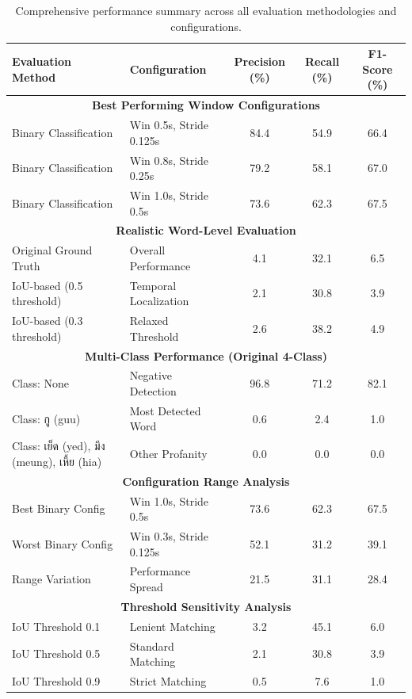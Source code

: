 \documentclass[11pt]{article}
\newcommand{\textthai}[1]{{\thaifont #1}}
\begin{document}
\begin{table}[H]
    \caption{Comprehensive performance summary across all evaluation methodologies and configurations.}
    \centering
    \label{tab:comprehensive-summary}
    \begin{tabular}{|l|l|c|c|c|}
        \hline
        \textbf{Evaluation Method} & \textbf{Configuration} & \textbf{Precision (\%)} & \textbf{Recall (\%)} & \textbf{F1-Score (\%)} \\
        \hline
        \multicolumn{5}{|c|}{\textbf{Best Performing Window Configurations}} \\
        \hline
        Binary Classification & Win 0.5s, Stride 0.125s & 84.4 & 54.9 & 66.4 \\
        Binary Classification & Win 0.8s, Stride 0.25s & 79.2 & 58.1 & 67.0 \\
        Binary Classification & Win 1.0s, Stride 0.5s & 73.6 & 62.3 & 67.5 \\
        \hline
        \multicolumn{5}{|c|}{\textbf{Realistic Word-Level Evaluation}} \\
        \hline
        Original Ground Truth & Overall Performance & 4.1 & 32.1 & 6.5 \\
        IoU-based (0.5 threshold) & Temporal Localization & 2.1 & 30.8 & 3.9 \\
        IoU-based (0.3 threshold) & Relaxed Threshold & 2.6 & 38.2 & 4.9 \\
        \hline
        \multicolumn{5}{|c|}{\textbf{Multi-Class Performance (Original 4-Class)}} \\
        \hline
        Class: None & Negative Detection & 96.8 & 71.2 & 82.1 \\
        Class: \textthai{กู} (guu) & Most Detected Word & 0.6 & 2.4 & 1.0 \\
        Class: \textthai{เย็ด} (yed), \textthai{มึง} (meung), \textthai{เหี้ย} (hia) & Other Profanity & 0.0 & 0.0 & 0.0 \\
        \hline
        \multicolumn{5}{|c|}{\textbf{Configuration Range Analysis}} \\
        \hline
        Best Binary Config & Win 1.0s, Stride 0.5s & 73.6 & 62.3 & 67.5 \\
        Worst Binary Config & Win 0.3s, Stride 0.125s & 52.1 & 31.2 & 39.1 \\
        Range Variation & Performance Spread & 21.5 & 31.1 & 28.4 \\
        \hline
        \multicolumn{5}{|c|}{\textbf{Threshold Sensitivity Analysis}} \\
        \hline
        IoU Threshold 0.1 & Lenient Matching & 3.2 & 45.1 & 6.0 \\
        IoU Threshold 0.5 & Standard Matching & 2.1 & 30.8 & 3.9 \\
        IoU Threshold 0.9 & Strict Matching & 0.5 & 7.6 & 1.0 \\
        \hline
    \end{tabular}
\end{table}
\end{document}

